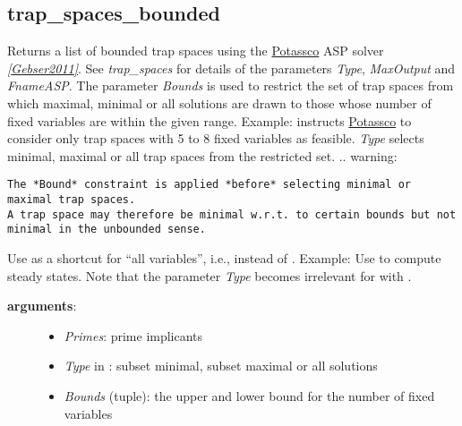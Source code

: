 \documentclass[letterpaper,10pt,english]{sphinxmanual}
\begin{document}
\subsection{trap\_spaces\_bounded}
\label{AspSolver:trap-spaces-bounded}\label{AspSolver:id6}

\begin{fulllineitems}
\label{AspSolver:PyBoolNet.AspSolver.trap_spaces_bounded}
Returns a list of bounded trap spaces using the \href{http://potassco.sourceforge.net/}{Potassco} ASP solver {\hyperref[Bibliography:gebser2011]{\emph{{[}Gebser2011{]}}}}.
See \emph{trap\_spaces} for details of the parameters \emph{Type}, \emph{MaxOutput} and \emph{FnameASP}.
The parameter \emph{Bounds} is used to restrict the set of trap spaces from which maximal, minimal or all solutions are drawn
to those whose number of fixed variables are within the given range.
Example:  instructs \href{http://potassco.sourceforge.net/}{Potassco} to consider only trap spaces with 5 to 8 fixed variables as feasible.
\emph{Type} selects minimal, maximal or all trap spaces from the restricted set.
.. warning:

\begin{Verbatim}[commandchars=\\\{\}]
The *Bound* constraint is applied *before* selecting minimal or maximal trap spaces.
A trap space may therefore be minimal w.r.t. to certain bounds but not minimal in the unbounded sense.
\end{Verbatim}

Use  as a shortcut for ``all variables'', i.e., instead of .
Example: Use  to compute steady states.
Note that the parameter \emph{Type} becomes irrelevant for  with .
\begin{description}
\item[{\textbf{arguments}:}] \leavevmode\begin{itemize}
\item {} 
\emph{Primes}: prime implicants

\item {} 
\emph{Type} in : subset minimal, subset maximal or all solutions

\item {} 
\emph{Bounds} (tuple): the upper and lower bound for the number of fixed variables


\end{itemize}
\end{description}
\end{fulllineitems}
\end{document}
